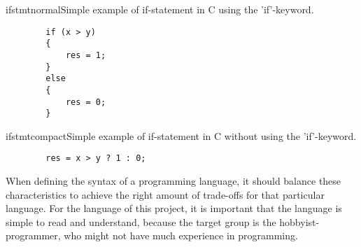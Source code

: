 \begin{code}{ifstmtnormal}{Simple example of if-statement in C using the 'if'-keyword.}
	\begin{lstlisting}
		if (x > y)
		{
    		res = 1;
		}
		else
		{
    		res = 0;
		}
	\end{lstlisting}
\end{code}

\begin{code}{ifstmtcompact}{Simple example of if-statement in C without using the 'if'-keyword.}
	\begin{lstlisting}
		res = x > y ? 1 : 0;
	\end{lstlisting}
\end{code}

When defining the syntax of a programming language, it should balance these characteristics to achieve the right amount of trade-offs for that particular language. For the language of this project, it is important that the language is simple to read and understand, because the target group is the hobbyist-programmer, who might not have much experience in programming.

